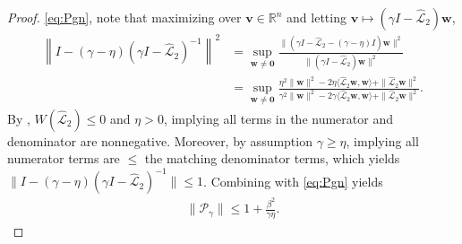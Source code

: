 \documentclass[review]{siamart}
\begin{document}
\begin{proof}
\eqref{eq:Pgn}, note that maximizing over $\mathbf{v}\in\mathbb{R}^n$ and
letting $\mathbf{v} \mapsto (\gamma I - \widehat{\mathcal{L}}_2)\mathbf{w}$,
%
\begin{align*}
\left\| I - (\gamma-\eta)(\gamma I - \widehat{\mathcal{L}}_2)^{-1}\right\|^2
& = \sup_{\mathbf{w}\neq\mathbf{0}} \frac{\| (\gamma I - \widehat{\mathcal{L}}_2 -
		(\gamma-\eta)I )\mathbf{w}\|^2}{\|(\gamma I - \widehat{\mathcal{L}}_2)
		\mathbf{w}\|^2} \\
& = \sup_{\mathbf{w}\neq\mathbf{0}} \frac{\eta^2\|\mathbf{w}\|^2
	- 2\eta\langle \widehat{\mathcal{L}}_2
		\mathbf{w},\mathbf{w}\rangle + \|\widehat{\mathcal{L}}_2\mathbf{w}\|^2}
	{\gamma^2\|\mathbf{w}\|^2 - 2\gamma \langle \widehat{\mathcal{L}}_2
		\mathbf{w},\mathbf{w}\rangle + \|\widehat{\mathcal{L}}_2\mathbf{w}\|^2}.
\end{align*}
%
By , $W(\widehat{\mathcal{L}}_2)\leq 0$ and $\eta > 0$, implying
all terms in the numerator and denominator are nonnegative. Moreover, by assumption
$\gamma \geq \eta$, implying all numerator terms are $\leq$ the matching
denominator terms, which yields $\| I - (\gamma-\eta)
(\gamma I - \widehat{\mathcal{L}}_2)^{-1}\| \leq 1$.
Combining with \eqref{eq:Pgn} yields
%
\begin{align}\label{eq:Pgamma_gen}
\|\mathcal{P}_\gamma\| \leq 1 + \frac{\beta^2}{\gamma\eta}.
\end{align}
%


\end{proof}
\end{document}
